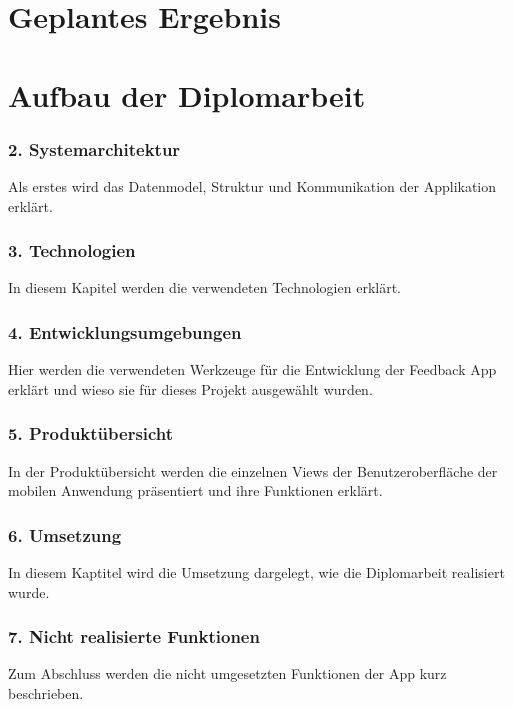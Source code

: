 \section{Geplantes Ergebnis}


\section{Aufbau der Diplomarbeit}

\subsubsection{2. Systemarchitektur}
Als erstes wird das Datenmodel, Struktur und Kommunikation der Applikation erklärt. 

\subsubsection{3. Technologien}
In diesem Kapitel werden die verwendeten Technologien erklärt.

\subsubsection{4. Entwicklungsumgebungen}
Hier werden die verwendeten Werkzeuge für die Entwicklung der Feedback App erklärt und 
wieso sie für dieses Projekt ausgewählt wurden.

\subsubsection{5. Produktübersicht}
In der Produktübersicht werden die einzelnen Views der Benutzeroberfläche der mobilen Anwendung präsentiert 
und ihre Funktionen erklärt.

\subsubsection{6. Umsetzung}
In diesem Kaptitel wird die Umsetzung dargelegt, wie die Diplomarbeit realisiert wurde.

\subsubsection{7. Nicht realisierte Funktionen}
Zum Abschluss werden die nicht umgesetzten Funktionen der App kurz beschrieben.
